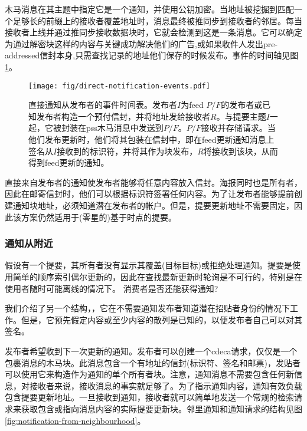 木马消息在其主题中指定它是一个通知，并使用公钥加密。当地址被挖掘到匹配一个足够长的前缀上的接收者覆盖地址时，消息最终被推同步到接收者的邻居。每当接收者上线并通过推同步接收数据块时，它就会检测到这是一条消息。它可以确定为通过解密块这样的内容与关键成功解决他们的广告,或如果收件人发出pre-addressed信封本身,只需查找记录的地址他们保存的时候发布。事件的时间轴见图\ref{fig:direct-notification-events}。


\begin{figure}[htbp]
   \centering
    \texttt{[image: fig/direct-notification-events.pdf]}
   \caption[直接通知从发布者的事件时间表\statusgreen]{直接通知从发布者的事件时间表。发布者$I$为feed $P/F$的发布者或已知发布者构造一个预付信封，并将地址发给接收者$R$。与提要主题$I$一起，它被封装在pss木马消息中发送到$P/F$。$P/F$接收并存储请求。当他们发布更新时，他们将其包装在信封中，即在feed更新通知消息上签名从$I$接收到的标识符，并将其作为块发布，$R$将接收到该块，从而得到feed更新的通知。 }
   \label{fig:direct-notification-events}
\end{figure}


直接来自发布者的通知使发布者能够将任意内容放入信封。海报同时也是所有者，因此在邮寄信封时，他们可以根据标识符签署任何内容。为了让发布者能够提前创建通知块地址，必须知道潜在发布者的帐户。但是，提要更新地址不需要固定，因此该方案仍然适用于(零星的)基于时点的提要。

\subsubsection{通知从附近}

假设有一个提要，其所有者没有显示其覆盖(目标目标)或拒绝处理通知。提要是使用简单的顺序索引偶尔更新的，因此在查找最新更新时轮询是不可行的，特别是在使用者随时可能离线的情况下。
消费者是否还能获得通知?

我们介绍了另一个结构，，它在不需要通知发布者知道潜在招贴者身份的情况下工作。但是，它预先假定内容或至少内容的散列是已知的，以便发布者自己可以对其签名。


发布者希望收到下一次更新的通知。发布者可以创建一个cdeca请求，仅仅是一个包裹消息的木马块。此消息包含一个有地址的信封(标识符、签名和邮票)，发贴者可以使用它来构造作为通知的单个所有者块。注意，通知消息不需要包含任何新信息，对接收者来说，接收消息的事实就足够了。为了指示通知内容，通知有效负载包含提要更新地址。一旦接收到通知，接收者就可以简单地发送一个常规的检索请求来获取包含或指向消息内容的实际提要更新块。邻里通知和通知请求的结构见图\ref{fig:notification-from-neighbourhood}。
                                

